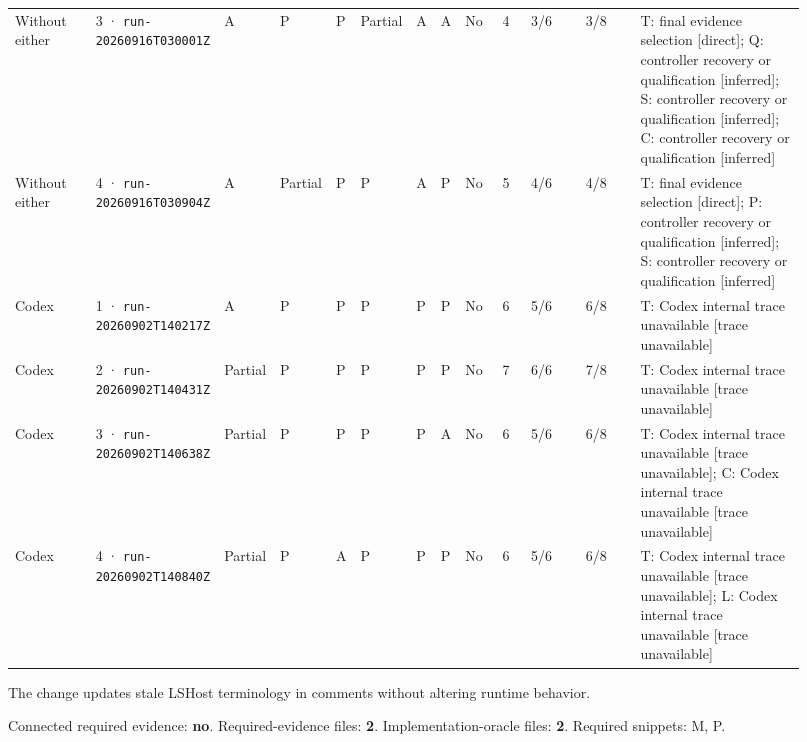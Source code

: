 \begin{landscape}
\begin{longtable}{@{}L{0.11\linewidth}L{0.16\linewidth}*{6}{L{0.022\linewidth}}L{0.05\linewidth}L{0.045\linewidth}L{0.08\linewidth}L{0.085\linewidth}L{0.258\linewidth}@{}}
Without either & 3 · \texttt{run-20260916\allowbreak T030001Z} & A & P & P & Partial & A & A & No & 4 & 3/6 & 3/8 & T: final evidence selection [direct]; Q: controller recovery or qualification [inferred]; S: controller recovery or qualification [inferred]; C: controller recovery or qualification [inferred] \\
Without either & 4 · \texttt{run-20260916\allowbreak T030904Z} & A & Partial & P & P & A & P & No & 5 & 4/6 & 4/8 & T: final evidence selection [direct]; P: controller recovery or qualification [inferred]; S: controller recovery or qualification [inferred] \\
Codex & 1 · \texttt{run-20260902\allowbreak T140217Z} & A & P & P & P & P & P & No & 6 & 5/6 & 6/8 & T: Codex internal trace unavailable [trace unavailable] \\
Codex & 2 · \texttt{run-20260902\allowbreak T140431Z} & Partial & P & P & P & P & P & No & 7 & 6/6 & 7/8 & T: Codex internal trace unavailable [trace unavailable] \\
Codex & 3 · \texttt{run-20260902\allowbreak T140638Z} & Partial & P & P & P & P & A & No & 6 & 5/6 & 6/8 & T: Codex internal trace unavailable [trace unavailable]; C: Codex internal trace unavailable [trace unavailable] \\
Codex & 4 · \texttt{run-20260902\allowbreak T140840Z} & Partial & P & A & P & P & P & No & 6 & 5/6 & 6/8 & T: Codex internal trace unavailable [trace unavailable]; L: Codex internal trace unavailable [trace unavailable] \\
\end{longtable}
\endgroup
\end{landscape}

\label{sec:microsoft-typescript-19074}

The change updates stale LSHost terminology in comments without altering runtime behavior.

Connected required evidence: \textbf{no}. Required-evidence files: \textbf{2}. Implementation-oracle files: \textbf{2}. Required snippets: M, P.

